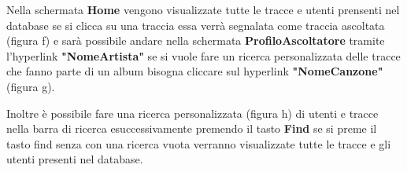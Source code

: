 \documentclass[11pt]{article}
\begin{document}
	Nella schermata \textbf{Home} vengono visualizzate tutte le tracce e utenti prensenti nel database se si clicca su una traccia
	essa verrà segnalata come traccia ascoltata (figura f) e sarà possibile andare nella schermata \textbf{ProfiloAscoltatore} tramite
	l'hyperlink \textbf{"NomeArtista"} se si vuole fare un ricerca personalizzata delle tracce che fanno parte di un album bisogna cliccare
	sul hyperlink  \textbf{"NomeCanzone"} (figura g).
	\begin{figure}[h]
		\centering
		
	\end{figure}
	Inoltre è possibile fare una ricerca personalizzata (figura h) di utenti e tracce nella barra di ricerca esuccessivamente premendo il tasto \textbf{Find}
	se si preme il tasto find senza con una ricerca vuota verranno visualizzate tutte le tracce e gli utenti presenti nel database.
\end{document}
